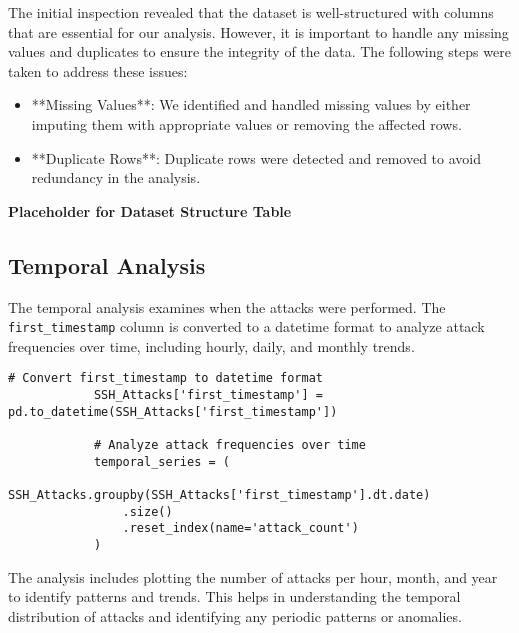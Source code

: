         The initial inspection revealed that the dataset is well-structured with columns that are essential for our analysis. However, it is important to handle any missing values and duplicates to ensure the integrity of the data. The following steps were taken to address these issues:

        \begin{itemize}
            \item **Missing Values**: We identified and handled missing values by either imputing them with appropriate values or removing the affected rows.
            \item **Duplicate Rows**: Duplicate rows were detected and removed to avoid redundancy in the analysis.
        \end{itemize}

        \textbf{Placeholder for Dataset Structure Table}

    \subsection{Temporal Analysis}
    
        The temporal analysis examines when the attacks were performed. The \texttt{first\_timestamp} column is converted to a datetime format to analyze attack frequencies over time, including hourly, daily, and monthly trends.
        
        \vspace{0.5em}

        \begin{lstlisting}[caption={Convert timestamps and analyze frequencies}, label={lst:convert-analyze-frequencies}]
            # Convert first_timestamp to datetime format
            SSH_Attacks['first_timestamp'] = pd.to_datetime(SSH_Attacks['first_timestamp'])

            # Analyze attack frequencies over time
            temporal_series = (
                SSH_Attacks.groupby(SSH_Attacks['first_timestamp'].dt.date)
                .size()
                .reset_index(name='attack_count')
            )
        \end{lstlisting}

        The analysis includes plotting the number of attacks per hour, month, and year to identify patterns and trends. This helps in understanding the temporal distribution of attacks and identifying any periodic patterns or anomalies.

